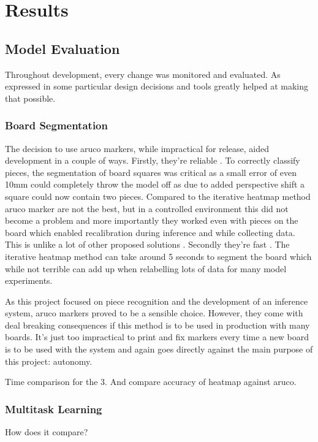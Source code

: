 \chapter{Results}
\label{results}

\section{Model Evaluation}
Throughout development, every change was monitored and evaluated.  As expressed in  some particular design decisions
and tools greatly helped at making that possible.

\subsection{Board Segmentation}
The decision to use aruco markers, while impractical for release, aided development in a couple of ways.  Firstly, they're reliable \cite{}.
To correctly classify pieces, the segmentation of board squares was critical as a small error of even 10mm could completely throw the
model off as due to added perspective shift a square could now contain two pieces.  Compared to the iterative heatmap method \cite{} aruco 
marker are not the best, but in a controlled environment this did not become a problem and more importantly they worked even with pieces on the
board which enabled recalibration during inference and while collecting data.  This is unlike a lot of other proposed solutions \cite{}.
Secondly they're fast \cite{}.  The iterative heatmap method can take around 5 seconds to segment the board which while not terrible can add up when 
relabelling lots of data for many model experiments.

As this project focused on piece recognition and the development of an inference system, aruco markers proved to be a sensible choice.  However, 
they come with deal breaking consequences if this method is to be used in production with many boards.  It's just too impractical to print and fix
markers every time a new board is to be used with the system and again goes directly against the main purpose of this project: autonomy.

Time comparison for the 3.  And compare accuracy of heatmap against aruco.

\subsection{Multitask Learning}
How does it compare?

